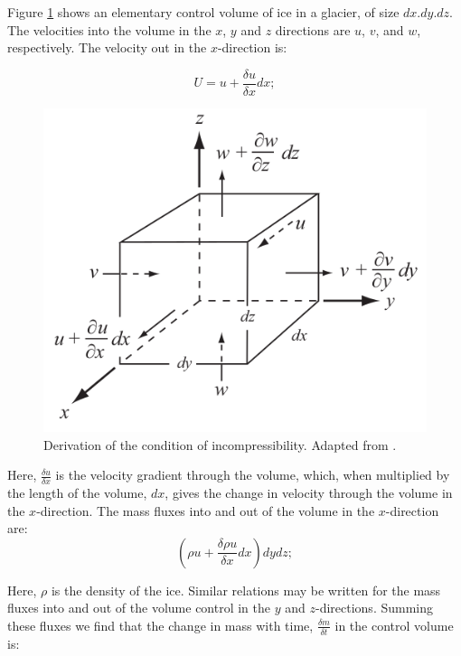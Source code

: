 \documentclass{article}
\begin{document}
Figure \ref{control_volume} shows an elementary control volume of ice in a glacier, of size $dx.dy.dz$. The velocities into the volume in the $x$, $y$ and $z$ directions are $u$, $v$, and $w$, respectively. The velocity out in the $x$-direction is:

\begin{equation}
	U = u+\frac{\delta u}{\delta x}dx;
\end{equation}

\begin{figure}[!h]
	\centering
	\includegraphics[width=0.5\linewidth]{../fig/Control_volume.png}
	\caption{Derivation of the condition of incompressibility. Adapted from \cite{hooke2019principles}.}
	\label{control_volume}
\end{figure}

Here, $\frac{\delta u}{\delta x}$ is the velocity gradient through the volume, which, when multiplied by the length of the volume, $dx$, gives the change in velocity through the volume in the $x$-direction. The mass fluxes into and out of the volume in the $x$-direction are:
\begin{equation}
	({\rho u + \frac{\delta \rho u}{\delta x}dx})dy dz;
\end{equation}

Here, $\rho$ is the density of the ice. Similar relations may be written for the mass fluxes into and out of the volume control in the $y$ and $z$-directions. Summing these fluxes we find that the change in mass with time, $\frac{\delta m}{\delta t}$ in the control volume is:
\end{document}
